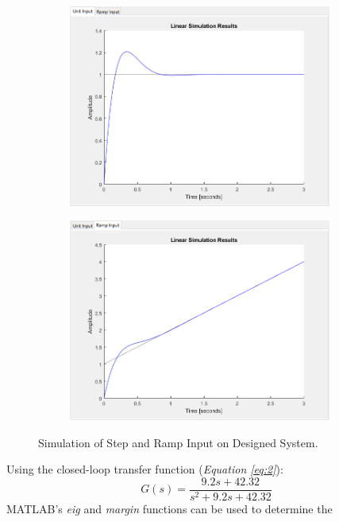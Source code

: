 \documentclass[10pt]{article}
\begin{document}
\begin{enumerate}[label=\textbf{\arabic*.}]
\begin{figure}[H]
\begin{subfigure}{0.5\textwidth}
      \includegraphics[width=0.95\textwidth]{p1_step.png}
    \end{subfigure}%
    \begin{subfigure}{0.5\textwidth}
      \centering
      \includegraphics[width=0.95\textwidth]{p1_ramp.png}
    \end{subfigure}%
    \caption{Simulation of Step and Ramp Input on Designed System.}
    \label{fig:1}
  \end{figure}
  Using the closed-loop transfer function (\emph{Equation \ref{eq:2}}):
  \begin{equation}
    G(s) = \dfrac{9.2s + 42.32}{s^2 + 9.2s + 42.32}
    \label{eq:2}
  \end{equation}
  MATLAB's \emph{eig} and \emph{margin} functions can be used to determine the 

\end{enumerate}
\end{document}
